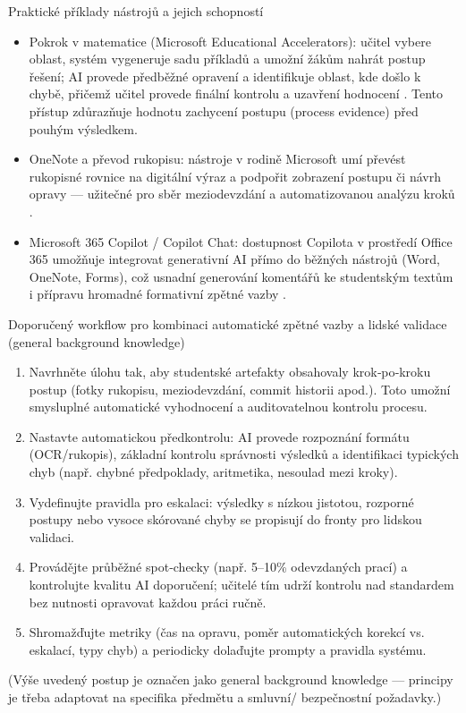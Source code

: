 \documentclass{report}%
\begin{document}
Praktické příklady nástrojů a jejich schopností
\begin{itemize}
  \item Pokrok v matematice (Microsoft Educational Accelerators): učitel vybere oblast, systém vygeneruje sadu příkladů a umožní žákům nahrát postup řešení; AI provede předběžné opravení a identifikuje oblast, kde došlo k chybě, přičemž učitel provede finální kontrolu a uzavření hodnocení \cite{kb_ai_101_tipu_pdf_04e4a115_page_8_1}. Tento přístup zdůrazňuje hodnotu zachycení postupu (process evidence) před pouhým výsledkem.
  \item OneNote a převod rukopisu: nástroje v rodině Microsoft umí převést rukopisné rovnice na digitální výraz a podpořit zobrazení postupu či návrh opravy — užitečné pro sběr meziodevzdání a automatizovanou analýzu kroků \cite{kb_ai_101_tipu_pdf_04e4a115_page_8_1}.
  \item Microsoft 365 Copilot / Copilot Chat: dostupnost Copilota v prostředí Office 365 umožňuje integrovat generativní AI přímo do běžných nástrojů (Word, OneNote, Forms), což usnadní generování komentářů ke studentským textům i přípravu hromadné formativní zpětné vazby \cite{kb_ai_101_tipu_pdf_04e4a115_page_3_1}.
\end{itemize}

Doporučený workflow pro kombinaci automatické zpětné vazby a lidské validace (general background knowledge)
\begin{enumerate}
  \item Navrhněte úlohu tak, aby studentské artefakty obsahovaly krok‑po‑kroku postup (fotky rukopisu, meziodevzdání, commit historii apod.). Toto umožní smysluplné automatické vyhodnocení a auditovatelnou kontrolu procesu.
  \item Nastavte automatickou předkontrolu: AI provede rozpoznání formátu (OCR/rukopis), základní kontrolu správnosti výsledků a identifikaci typických chyb (např. chybné předpoklady, aritmetika, nesoulad mezi kroky).
  \item Vydefinujte pravidla pro eskalaci: výsledky s nízkou jistotou, rozporné postupy nebo vysoce skórované chyby se propisují do fronty pro lidskou validaci.
  \item Provádějte průběžné spot‑checky (např. 5–10\% odevzdaných prací) a kontrolujte kvalitu AI doporučení; učitelé tím udrží kontrolu nad standardem bez nutnosti opravovat každou práci ručně.
  \item Shromažďujte metriky (čas na opravu, poměr automatických korekcí vs. eskalací, typy chyb) a periodicky dolaďujte prompty a pravidla systému.
\end{enumerate}
(Výše uvedený postup je označen jako general background knowledge — principy je třeba adaptovat na specifika předmětu a smluvní/ bezpečnostní požadavky.)
\end{document}
